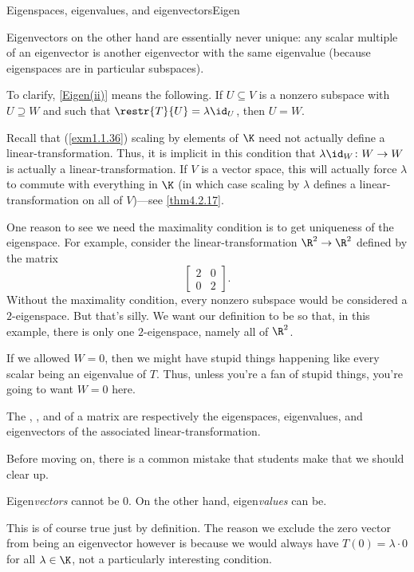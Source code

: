 \begin{dfn}{Eigenspaces, eigenvalues, and eig\-envectors}{Eigen}
\begin{rmk}
		Eigenvectors on the other hand are essentially never unique:  any scalar multiple of an eigenvector is another eigenvector with the same eigenvalue (because eigenspaces are in particular subspaces).
	\end{rmk}
	\begin{rmk}
		To clarify, \cref{Eigen(ii)} means the following.  If $U\subseteq V$ is a nonzero subspace with $U\supseteq W$ and such that $\restr{T}{U}=\lambda \id _U$, then $U=W$.
	\end{rmk}
	\begin{rmk}
		Recall that (\cref{exm1.1.36}) scaling by elements of $\K$ need not actually define a linear-transformation.  Thus, it is implicit in this condition that $\lambda \id _W\colon W\rightarrow W$ is actually a linear-transformation.  If $V$ is a vector space, this will actually force $\lambda$ to commute with everything in $\K$ (in which case scaling by $\lambda$ defines a linear-transformation on all of $V$)---see \cref{thm4.2.17}.
	\end{rmk}
	\begin{rmk}
		One reason to see we need the maximality condition is to get uniqueness of the eigenspace.  For example, consider the linear-transformation $\R ^2\rightarrow \R ^2$ defined by the matrix
		\begin{equation}
			\begin{bmatrix}2 & 0 \\ 0 & 2\end{bmatrix}.
		\end{equation}
		Without the maximality condition, every nonzero subspace would be considered a $2$-eigenspace.  But that's silly.  We want our definition to be so that, in this example, there is only one $2$-eigenspace, namely all of $\R ^2$.
	\end{rmk}
	\begin{rmk}
		If we allowed $W=0$, then we might have stupid things happening like every scalar being an eigenvalue of $T$.  Thus, unless you're a fan of stupid things, you're going to want $W=0$ here.
	\end{rmk}
	\begin{rmk}
		The , , and  of a matrix are respectively the eigenspaces, eigenvalues, and eigenvectors of the associated linear-transformation.
	\end{rmk}
\end{dfn}
Before moving on, there is a common mistake that students make that we should clear up.
\begin{important}
	Eigen\emph{vectors} cannot be $0$.  On the other hand, eigen\emph{values} can be.
	
	This is of course true just by definition.  The reason we exclude the zero vector from being an eigenvector however is because we would always have $T(0)=\lambda \cdot 0$ for all $\lambda \in \K$, not a particularly interesting condition.
\end{important}

